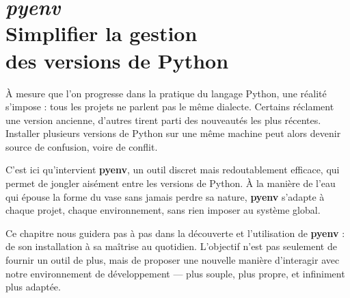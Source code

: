 \chapter[\textit{pyenv}]{\textit{pyenv} \\ Simplifier la gestion \\ des versions de Python}

\bigskip

À mesure que l’on progresse dans la pratique du langage Python, une réalité s’impose : tous les projets ne parlent pas le même dialecte. Certains réclament une version ancienne, d’autres tirent parti des nouveautés les plus récentes. Installer plusieurs versions de Python sur une même machine peut alors devenir source de confusion, voire de conflit.

C’est ici qu’intervient \textbf{pyenv}, un outil discret mais redoutablement efficace, qui permet de jongler aisément entre les versions de Python. À la manière de l’eau qui épouse la forme du vase sans jamais perdre sa nature, \textbf{pyenv} s’adapte à chaque projet, chaque environnement, sans rien imposer au système global.

Ce chapitre nous guidera pas à pas dans la découverte et l’utilisation de \textbf{pyenv} : de son installation à sa maîtrise au quotidien. L’objectif n’est pas seulement de fournir un outil de plus, mais de proposer une nouvelle manière d’interagir avec notre environnement de développement — plus souple, plus propre, et infiniment plus adaptée.


